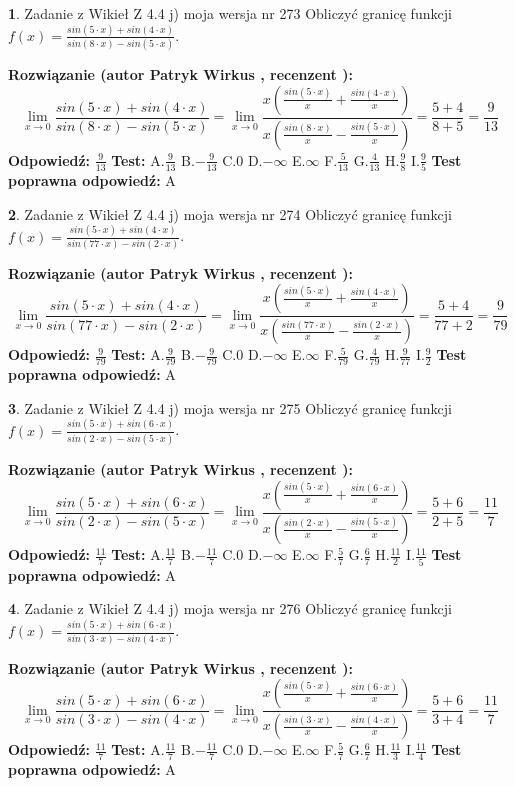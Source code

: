\documentclass[12pt, a4paper]{article}
\theoremstyle{definition} %
\newtheorem{zad}{}
\newcommand{\zadStart}[1]{\begin{zad}#1\newline}
\newcommand{\zadStop}{\end{zad}}
\newcommand{\rozwStart}[2]{\noindent \textbf{Rozwiązanie (autor #1 , recenzent #2): }\newline}
\newcommand{\rozwStop}{\newline}
\newcommand{\odpStart}{\noindent \textbf{Odpowiedź:}\newline}
\newcommand{\odpStop}{\newline}
\newcommand{\testStart}{\noindent \textbf{Test:}\newline}
\newcommand{\testStop}{\newline}
\newcommand{\kluczStart}{\noindent \textbf{Test poprawna odpowiedź:}\newline}
\newcommand{\kluczStop}{\newline}
\begin{document}
\zadStart{Zadanie z Wikieł Z 4.4 j) moja wersja nr 273}
Obliczyć granicę funkcji $f(x)=\frac{sin(5\cdot x) +sin(4\cdot x)}{sin(8\cdot x) -sin(5\cdot x)}$.
\zadStop
\rozwStart{Patryk Wirkus}{}
$$\lim\limits_{x\to 0}\frac{sin(5\cdot x) +sin(4\cdot x)}{sin(8\cdot x) -sin(5\cdot x)}=\lim\limits_{x\to 0}\frac{x(\frac{sin(5\cdot x)}{x}+\frac{sin(4\cdot x)}{x})}{x(\frac{sin(8\cdot x)}{x}-\frac{sin(5\cdot x)}{x})}=\frac{5+4}{8+5} = \frac{9}{13}$$
\rozwStop
\odpStart
$\frac{9}{13}$
\odpStop
\testStart
A.$\frac{9}{13}$
B.$-\frac{9}{13}$
C.$0$
D.$-\infty$
E.$\infty$
F.$\frac{5}{13}$
G.$\frac{4}{13}$
H.$\frac{9}{8}$
I.$\frac{9}{5}$
\testStop
\kluczStart
A
\kluczStop



\zadStart{Zadanie z Wikieł Z 4.4 j) moja wersja nr 274}
Obliczyć granicę funkcji $f(x)=\frac{sin(5\cdot x) +sin(4\cdot x)}{sin(77\cdot x) -sin(2\cdot x)}$.
\zadStop
\rozwStart{Patryk Wirkus}{}
$$\lim\limits_{x\to 0}\frac{sin(5\cdot x) +sin(4\cdot x)}{sin(77\cdot x) -sin(2\cdot x)}=\lim\limits_{x\to 0}\frac{x(\frac{sin(5\cdot x)}{x}+\frac{sin(4\cdot x)}{x})}{x(\frac{sin(77\cdot x)}{x}-\frac{sin(2\cdot x)}{x})}=\frac{5+4}{77+2} = \frac{9}{79}$$
\rozwStop
\odpStart
$\frac{9}{79}$
\odpStop
\testStart
A.$\frac{9}{79}$
B.$-\frac{9}{79}$
C.$0$
D.$-\infty$
E.$\infty$
F.$\frac{5}{79}$
G.$\frac{4}{79}$
H.$\frac{9}{77}$
I.$\frac{9}{2}$
\testStop
\kluczStart
A
\kluczStop



\zadStart{Zadanie z Wikieł Z 4.4 j) moja wersja nr 275}
Obliczyć granicę funkcji $f(x)=\frac{sin(5\cdot x) +sin(6\cdot x)}{sin(2\cdot x) -sin(5\cdot x)}$.
\zadStop
\rozwStart{Patryk Wirkus}{}
$$\lim\limits_{x\to 0}\frac{sin(5\cdot x) +sin(6\cdot x)}{sin(2\cdot x) -sin(5\cdot x)}=\lim\limits_{x\to 0}\frac{x(\frac{sin(5\cdot x)}{x}+\frac{sin(6\cdot x)}{x})}{x(\frac{sin(2\cdot x)}{x}-\frac{sin(5\cdot x)}{x})}=\frac{5+6}{2+5} = \frac{11}{7}$$
\rozwStop
\odpStart
$\frac{11}{7}$
\odpStop
\testStart
A.$\frac{11}{7}$
B.$-\frac{11}{7}$
C.$0$
D.$-\infty$
E.$\infty$
F.$\frac{5}{7}$
G.$\frac{6}{7}$
H.$\frac{11}{2}$
I.$\frac{11}{5}$
\testStop
\kluczStart
A
\kluczStop



\zadStart{Zadanie z Wikieł Z 4.4 j) moja wersja nr 276}
Obliczyć granicę funkcji $f(x)=\frac{sin(5\cdot x) +sin(6\cdot x)}{sin(3\cdot x) -sin(4\cdot x)}$.
\zadStop
\rozwStart{Patryk Wirkus}{}
$$\lim\limits_{x\to 0}\frac{sin(5\cdot x) +sin(6\cdot x)}{sin(3\cdot x) -sin(4\cdot x)}=\lim\limits_{x\to 0}\frac{x(\frac{sin(5\cdot x)}{x}+\frac{sin(6\cdot x)}{x})}{x(\frac{sin(3\cdot x)}{x}-\frac{sin(4\cdot x)}{x})}=\frac{5+6}{3+4} = \frac{11}{7}$$
\rozwStop
\odpStart
$\frac{11}{7}$
\odpStop
\testStart
A.$\frac{11}{7}$
B.$-\frac{11}{7}$
C.$0$
D.$-\infty$
E.$\infty$
F.$\frac{5}{7}$
G.$\frac{6}{7}$
H.$\frac{11}{3}$
I.$\frac{11}{4}$
\testStop
\kluczStart
A
\kluczStop
\end{document}
